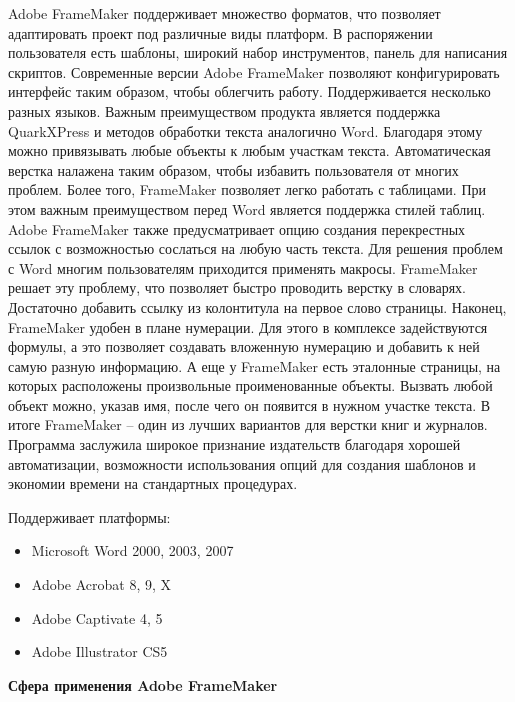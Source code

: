 \documentclass[a4paper,12pt]{article} %
\begin{document}
        Adobe FrameMaker поддерживает множество форматов, что позволяет адаптировать проект под различные виды платформ. В распоряжении пользователя есть шаблоны, широкий набор инструментов, панель для написания скриптов. Современные версии Adobe FrameMaker позволяют конфигурировать интерфейс таким образом, чтобы облегчить работу.     Поддерживается несколько разных языков.
         Важным преимуществом продукта является поддержка QuarkXPress и методов обработки текста аналогично Word. Благодаря этому можно привязывать любые объекты к любым участкам текста. Автоматическая верстка налажена таким образом, чтобы избавить пользователя от многих проблем. Более того, FrameMaker позволяет легко работать с таблицами. При этом важным преимуществом перед Word является поддержка стилей таблиц. 
         Adobe FrameMaker также предусматривает опцию создания перекрестных ссылок с возможностью сослаться на любую часть текста. Для решения проблем с Word многим пользователям приходится применять макросы. FrameMaker решает эту проблему, что позволяет быстро проводить верстку в словарях. Достаточно добавить ссылку из колонтитула на первое слово страницы.
        Наконец, FrameMaker удобен в плане нумерации. Для этого в комплексе задействуются формулы, а это позволяет создавать вложенную нумерацию и добавить к ней самую разную информацию. А еще у FrameMaker есть эталонные страницы, на которых расположены произвольные проименованные объекты. Вызвать любой объект можно, указав имя, после чего он появится в нужном участке текста.
          В итоге FrameMaker – один из лучших вариантов для верстки книг и журналов. Программа заслужила широкое признание издательств благодаря хорошей автоматизации, возможности использования опций для создания шаблонов и экономии времени на стандартных процедурах.


Поддерживает платформы: 
\begin{itemize}
\item Microsoft Word 2000, 2003, 2007
\item Adobe Acrobat 8, 9, X
\item Adobe Captivate 4, 5
\item Adobe Illustrator CS5
\end{itemize}

\newpage

\begin{center}
\Large \textbf{Сфера применения Adobe FrameMaker}
\end{center}

\normalsize
\end{document}
